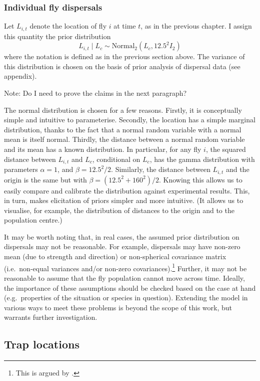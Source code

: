 \documentclass[
  oneside]{book}
\begin{document}
\hypertarget{individual-fly-dispersals}{%
\subsubsection{Individual fly dispersals}\label{individual-fly-dispersals}}

Let \(L_{i, t}\) denote the location of fly \(i\) at time \(t\), as in the previous chapter. I assign this quantity the prior distribution
\[
L_{i, t} \mid L_c \sim \mathrm {Normal}_2 (L_c, 12.5^2 I_2)
\]
where the notation is defined as in the previous section above. The variance of this distribution is chosen on the basis of prior analysis of dispersal data (see appendix).

Note: Do I need to prove the claims in the next paragraph?

The normal distribution is chosen for a few reasons. Firstly, it is conceptually simple and intuitive to parameterise. Secondly, the location has a simple marginal distribution, thanks to the fact that a normal random variable with a normal mean is itself normal. Thirdly, the distance between a normal random variable and its mean has a known distribution. In particular, for any fly \(i\), the squared distance between \(L_{i,t}\) and \(L_c\), conditional on \(L_c\), has the gamma distribution with parameters \(\alpha = 1\), and \(\beta = 12.5^2 / 2\). Similarly, the distance between \(L_{i, t}\) and the origin is the same but with \(\beta = (12.5^2 + 160^2) / 2\). Knowing this allows us to easily compare and calibrate the distribution against experimental results. This, in turn, makes elicitation of priors simpler and more intuitive. (It allows us to visualise, for example, the distribution of distances to the origin and to the population centre.)

It may be worth noting that, in real cases, the assumed prior distribution on dispersals may not be reasonable. For example, dispersals may have non-zero mean (due to strength and direction) or non-spherical covariance matrix (i.e.~non-equal variances and/or non-zero covariances).\footnote{This is argued by \citet{baker1986}.} Further, it may not be reasonable to assume that the fly population cannot move across time. Ideally, the importance of these assumptions should be checked based on the case at hand (e.g.~properties of the situation or species in question). Extending the model in various ways to meet these problems is beyond the scope of this work, but warrants further investigation.

\hypertarget{trap-locations}{%
\subsection{Trap locations}\label{trap-locations}}
\end{document}

